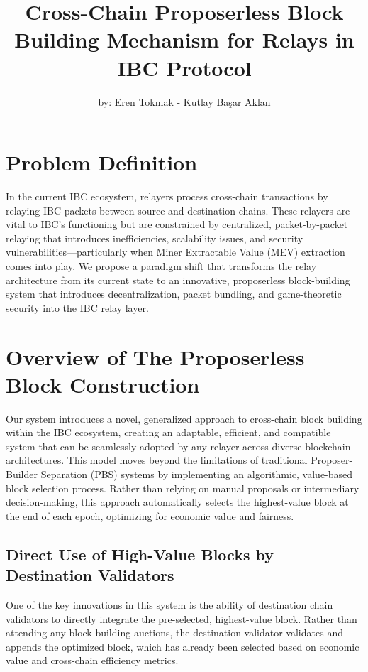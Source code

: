 \documentclass{article}
\begin{document}
\title{Cross-Chain Proposerless Block Building Mechanism for Relays in IBC Protocol}
\author{by: Eren Tokmak - Kutlay Başar Aklan}
\date{}

\maketitle

\section*{Problem Definition}

In the current IBC ecosystem, relayers process cross-chain transactions by relaying IBC packets between source and destination chains. These relayers are vital to IBC’s functioning but are constrained by centralized, packet-by-packet relaying that introduces inefficiencies, scalability issues, and security vulnerabilities—particularly when Miner Extractable Value (MEV) extraction comes into play. We propose a paradigm shift that transforms the relay architecture from its current state to an innovative, proposerless block-building system that introduces decentralization, packet bundling, and game-theoretic security into the IBC relay layer.

\section*{Overview of The Proposerless Block Construction}

Our system introduces a novel, generalized approach to cross-chain block building within the IBC ecosystem, creating an adaptable, efficient, and compatible system that can be seamlessly adopted by any relayer across diverse blockchain architectures. This model moves beyond the limitations of traditional Proposer-Builder Separation (PBS) systems by implementing an algorithmic, value-based block selection process. Rather than relying on manual proposals or intermediary decision-making, this approach automatically selects the highest-value block at the end of each epoch, optimizing for economic value and fairness.

\subsection*{Direct Use of High-Value Blocks by Destination Validators}

One of the key innovations in this system is the ability of destination chain validators to directly integrate the pre-selected, highest-value block. Rather than attending any block building auctions, the destination validator validates and appends the optimized block, which has already been selected based on economic value and cross-chain efficiency metrics.
\end{document}

